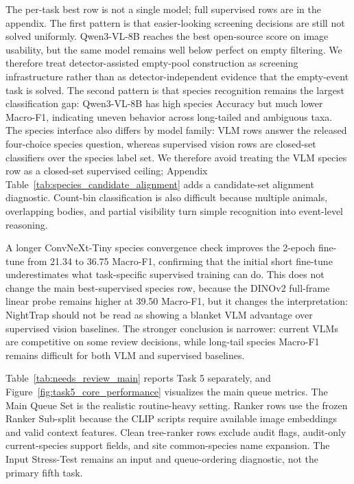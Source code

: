 \documentclass{article}
\begin{document}
The per-task best row is not a single model; full supervised rows are in the appendix. The first pattern is that easier-looking screening decisions are still not solved uniformly. Qwen3-VL-8B reaches the best open-source score on image usability, but the same model remains well below perfect on empty filtering. We therefore treat detector-assisted empty-pool construction as screening infrastructure rather than as detector-independent evidence that the empty-event task is solved. The second pattern is that species recognition remains the largest classification gap: Qwen3-VL-8B has high species Accuracy but much lower Macro-F1, indicating uneven behavior across long-tailed and ambiguous taxa. The species interface also differs by model family: VLM rows answer the released four-choice species question, whereas supervised vision rows are closed-set classifiers over the species label set. We therefore avoid treating the VLM species row as a closed-set supervised ceiling; Appendix Table~\ref{tab:species_candidate_alignment} adds a candidate-set alignment diagnostic. Count-bin classification is also difficult because multiple animals, overlapping bodies, and partial visibility turn simple recognition into event-level reasoning.

A longer ConvNeXt-Tiny species convergence check improves the 2-epoch fine-tune from 21.34 to 36.75 Macro-F1, confirming that the initial short fine-tune underestimates what task-specific supervised training can do. This does not change the main best-supervised species row, because the DINOv2 full-frame linear probe remains higher at 39.50 Macro-F1, but it changes the interpretation: NightTrap should not be read as showing a blanket VLM advantage over supervised vision baselines. The stronger conclusion is narrower: current VLMs are competitive on some review decisions, while long-tail species Macro-F1 remains difficult for both VLM and supervised baselines.

Table~\ref{tab:needs_review_main} reports Task 5 separately, and Figure~\ref{fig:task5_core_performance} visualizes the main queue metrics. The Main Queue Set is the realistic routine-heavy setting. Ranker rows use the frozen Ranker Sub-split because the CLIP scripts require available image embeddings and valid context features. Clean tree-ranker rows exclude audit flags, audit-only current-species support fields, and site common-species name expansion. The Input Stress-Test remains an input and queue-ordering diagnostic, not the primary fifth task.
\end{document}

